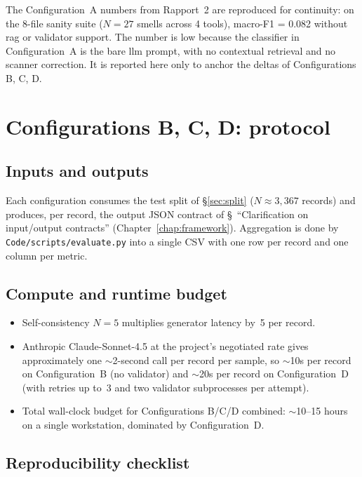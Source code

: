 \documentclass[12pt, a4paper]{report}
\begin{document}
The Configuration~A numbers from Rapport~2 are reproduced for continuity:
on the 8-file sanity suite ($N=27$ smells across 4 tools), macro-F1 = 0.082
without \gls{rag} or validator support. The number is low because the
classifier in Configuration~A is the bare \gls{llm} prompt, with no
contextual retrieval and no scanner correction. It is reported here only
to anchor the deltas of Configurations B, C, D.

\section{Configurations B, C, D: protocol}

\subsection{Inputs and outputs}

Each configuration consumes the test split of \S\ref{sec:split}
($N \approx 3{,}367$ records) and produces, per record, the output JSON
contract of \S~``Clarification on input/output contracts''
(Chapter~\ref{chap:framework}). Aggregation is done by
\texttt{Code/scripts/evaluate.py} into a single CSV with one row per
record and one column per metric.

\subsection{Compute and runtime budget}

\begin{itemize}
  \item Self-consistency $N=5$ multiplies generator latency by~5 per record.
  \item Anthropic Claude-Sonnet-4.5 at the project's negotiated rate gives
        approximately one $\sim$2-second call per record per sample, so
        $\sim$10s per record on Configuration~B (no validator) and
        $\sim$20s per record on Configuration~D (with retries up to~3 and
        two validator subprocesses per attempt).
  \item Total wall-clock budget for Configurations B/C/D combined:
        $\sim$10--15 hours on a single workstation, dominated by
        Configuration~D.
\end{itemize}

\subsection{Reproducibility checklist}
\end{document}
